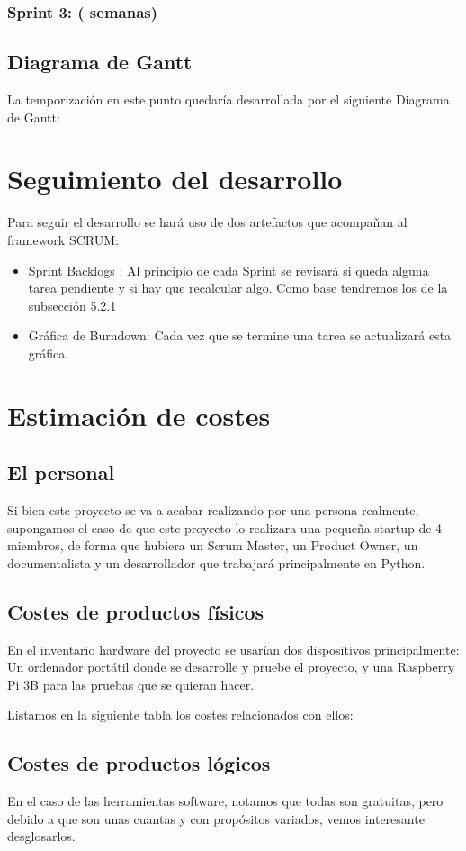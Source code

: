 \subsubsection{Sprint 3: ( semanas)}

\subsection{Diagrama de Gantt}
La temporización en este punto quedaría desarrollada por el siguiente Diagrama de Gantt:


\section{Seguimiento del desarrollo}
Para seguir el desarrollo se hará uso de dos artefactos que acompañan al framework SCRUM:
\begin{itemize}
	\item Sprint Backlogs : Al principio de cada Sprint se revisará si queda alguna tarea pendiente y si hay que recalcular algo. Como base tendremos los de la subsección 5.2.1
	\item Gráfica de Burndown: Cada vez que se termine una tarea se actualizará esta gráfica.
\end{itemize}

\section{Estimación de costes}
\subsection{El personal}
Si bien este proyecto se va a acabar realizando por una persona realmente, supongamos el caso de que este proyecto lo realizara una pequeña startup de 4 miembros, de forma que hubiera un Scrum Master, un Product Owner, un documentalista y un desarrollador que trabajará principalmente en Python.

\subsection {Costes de productos físicos}
En el inventario hardware del proyecto se usarían dos dispositivos principalmente: Un ordenador portátil donde se desarrolle y pruebe el proyecto, y una Raspberry Pi 3B para las pruebas que se quieran hacer.

Listamos en la siguiente tabla los costes relacionados con ellos:

\subsection{Costes de productos lógicos}
En el caso de las herramientas software, notamos que todas son gratuitas, pero debido a que son unas cuantas y con propósitos variados, vemos interesante desglosarlos.


